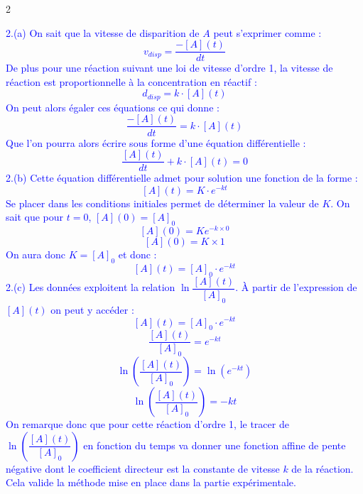 \documentclass[a4paper,11pt,fleqn]{article}%
\begin{document}
\begin{multicols}{2}
{
}
\textcolor{blue}{
2.(a)
On sait que la vitesse de disparition de $A$ peut s'exprimer comme : $$v_{disp} = \dfrac{-[A](t)}{dt}$$
De plus pour une réaction suivant une loi de vitesse d'ordre 1, la vitesse de réaction est proportionnelle à la concentration en réactif : $$ d_{disp} = k\cdot [A](t)$$
On peut alors égaler ces équations ce qui donne : $$ \dfrac{-[A](t)}{dt} = k\cdot [A](t) $$
Que l'on pourra alors écrire sous forme d'une équation différentielle : $$ \dfrac{[A](t)}{dt} + k\cdot [A](t) = 0$$
2.(b) Cette équation différentielle admet pour solution une fonction de la forme : $$ [A](t) = K\cdot e^{-kt}$$
Se placer dans les conditions initiales permet de déterminer la valeur de $K$. On sait que pour $t=0$, $[A](0) = [A]_0$
$$ [A](0) = K e^{-k\times 0}$$
$$ [A](0) = K \times 1$$
On aura donc $K = [A]_0$ et donc : $$ [A](t) = [A]_0\cdot e^{-kt}$$
2.(c) Les données exploitent la relation $\ln{\dfrac{[A](t)}{[A]_0}}$. À partir de l'expression de $[A](t)$ on peut y accéder : 
$$ [A](t) = [A]_0\cdot e^{-kt} $$
$$ \dfrac{[A](t)}{[A]_0} = e^{-kt} $$
$$ \ln \left(\dfrac{[A](t)}{[A]_0}\right) = \ln(e^{-kt}) $$
$$ \ln \left(\dfrac{[A](t)}{[A]_0}\right) = -kt$$
On remarque donc que pour cette réaction d'ordre 1, le tracer de $\ln \left(\dfrac{[A](t)}{[A]_0}\right)$ en fonction du temps va donner une fonction affine de pente négative dont le coefficient directeur est la constante de vitesse $k$ de la réaction. Cela valide la méthode mise en place dans la partie expérimentale.
}
\end{multicols}
\end{document}
